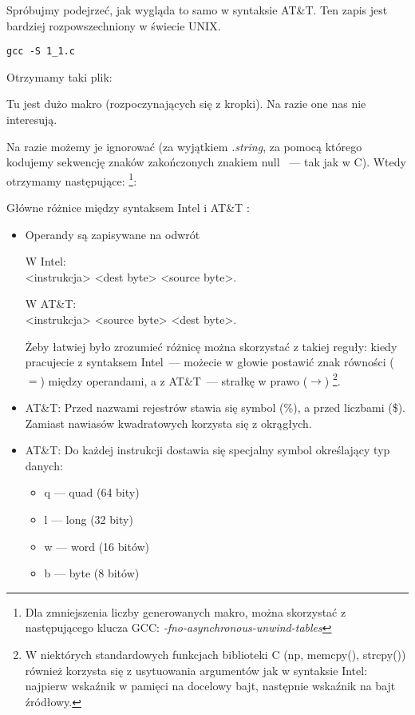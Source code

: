 Spróbujmy podejrzeć, jak wygląda to samo w syntaksie AT\&T.
Ten zapis jest bardziej rozpowszechniony w świecie UNIX.

\begin{lstlisting}[caption=kompilujemy w GCC 4.7.3]
gcc -S 1_1.c
\end{lstlisting}

Otrzymamy taki plik:



Tu jest dużo makro (rozpoczynających się z kropki). Na razie one nas nie interesują.

Na razie możemy je ignorować (za wyjątkiem \emph{.string}, za pomocą którego kodujemy sekwencję znaków zakończonych znakiem null ~--- tak jak w C). Wtedy otrzymamy następujące:
\footnote{Dla zmniejszenia liczby generowanych  makro, można skorzystać z następującego klucza GCC: \emph{-fno-asynchronous-unwind-tables}}:



\myindex{\ATTSyntax}
\myindex{\IntelSyntax}
Główne różnice między syntaksem Intel i AT\&T :

\begin{itemize}

\item
Operandy są zapisywane na odwrót

W Intel: \\
<instrukcja> <dest byte> <source byte>.

W AT\&T: \\
<instrukcja> <source byte> <dest byte>.

Żeby łatwiej było zrozumieć różnicę można skorzystać z takiej reguły:
kiedy pracujecie z syntaksem Intel~--- możecie w głowie postawić znak równości ($=$) między operandami,
a z AT\&T~--- strałkę w prawo ($\rightarrow$)
\footnote{W niektórych standardowych funkcjach biblioteki C (np, memcpy(), strcpy()) również korzysta się z usytuowania argumentów jak w syntaksie Intel: najpierw wskaźnik w pamięci na docelowy bajt, 
następnie wskaźnik na bajt źródłowy.}.

\item
AT\&T: Przed nazwami rejestrów stawia się symbol (\%), a przed liczbami (\$).
Zamiast nawiasów kwadratowych korzysta się z okrągłych.

\item
AT\&T: Do każdej instrukcji dostawia się specjalny symbol określający typ danych:

\begin{itemize}
\item q --- quad (64 bity)
\item l --- long (32 bity)
\item w --- word (16 bitów)
\item b --- byte (8 bitów)
\end{itemize}


\end{itemize}

